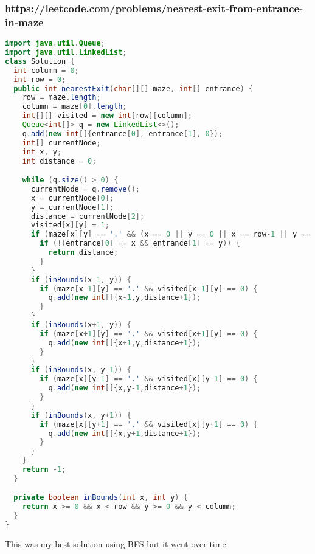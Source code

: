 \documentclass[12pt]{article}
\begin{document}
\subsubsection{https://leetcode.com/problems/nearest-exit-from-entrance-in-maze}
\begin{lstlisting}[language=Java]
import java.util.Queue;
import java.util.LinkedList;
class Solution {
  int column = 0;
  int row = 0;
  public int nearestExit(char[][] maze, int[] entrance) {
    row = maze.length;
    column = maze[0].length;
    int[][] visited = new int[row][column];
    Queue<int[]> q = new LinkedList<>();
    q.add(new int[]{entrance[0], entrance[1], 0});
    int[] currentNode;
    int x, y;
    int distance = 0;

    while (q.size() > 0) {
      currentNode = q.remove();
      x = currentNode[0];
      y = currentNode[1];
      distance = currentNode[2];
      visited[x][y] = 1;
      if (maze[x][y] == '.' && (x == 0 || y == 0 || x == row-1 || y == column-1) && distance > 0) {
        if (!(entrance[0] == x && entrance[1] == y)) {
          return distance;
        }
      }
      if (inBounds(x-1, y)) {
        if (maze[x-1][y] == '.' && visited[x-1][y] == 0) {
          q.add(new int[]{x-1,y,distance+1});
        }
      }
      if (inBounds(x+1, y)) {
        if (maze[x+1][y] == '.' && visited[x+1][y] == 0) {
          q.add(new int[]{x+1,y,distance+1});
        }
      }
      if (inBounds(x, y-1)) {
        if (maze[x][y-1] == '.' && visited[x][y-1] == 0) {
          q.add(new int[]{x,y-1,distance+1});
        }
      }
      if (inBounds(x, y+1)) {
        if (maze[x][y+1] == '.' && visited[x][y+1] == 0) {
          q.add(new int[]{x,y+1,distance+1});
        }
      }
    }
    return -1;
  }

  private boolean inBounds(int x, int y) {
    return x >= 0 && x < row && y >= 0 && y < column;
  }
}
\end{lstlisting}

This was my best solution using BFS but it went over time.
\end{document}

